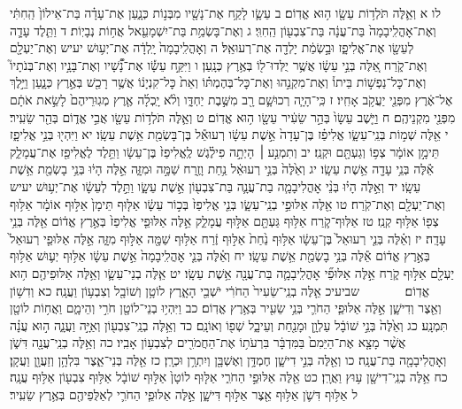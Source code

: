 \documentclass[twoside, openany, parskip=half, 11pt]{book}
\begin{document}
לו א וְאֵ֛לֶּה תֹּלְד֥וֹת עֵשָׂ֖ו ה֥וּא אֱדֽוֹם׃ ב עֵשָׂ֛ו לָקַ֥ח אֶת־נָשָׁ֖יו מִבְּנ֣וֹת כְּנָ֑עַן אֶת־עָדָ֗ה בַּת־אֵילוֹן֙ הַֽחִתִּ֔י וְאֶת־אׇהֳלִֽיבָמָה֙ בַּת־עֲנָ֔ה בַּת־צִבְע֖וֹן הַֽחִוִּֽי׃ ג וְאֶת־בָּשְׂמַ֥ת בַּת־יִשְׁמָעֵ֖אל אֲח֥וֹת נְבָיֽוֹת׃ ד וַתֵּ֧לֶד עָדָ֛ה לְעֵשָׂ֖ו אֶת־אֱלִיפָ֑ז וּבָ֣שְׂמַ֔ת יָלְדָ֖ה אֶת־רְעוּאֵֽל׃ ה וְאׇהֳלִֽיבָמָה֙ יָֽלְדָ֔ה אֶת־יְע֥וּשׁ יעיש וְאֶת־יַעְלָ֖ם וְאֶת־קֹ֑רַח אֵ֚לֶּה בְּנֵ֣י עֵשָׂ֔ו אֲשֶׁ֥ר יֻלְּדוּ־ל֖וֹ בְּאֶ֥רֶץ כְּנָֽעַן׃ ו וַיִּקַּ֣ח עֵשָׂ֡ו אֶת־נָ֠שָׁ֠יו וְאֶת־בָּנָ֣יו וְאֶת־בְּנֹתָיו֮ וְאֶת־כׇּל־נַפְשׁ֣וֹת בֵּיתוֹ֒ וְאֶת־מִקְנֵ֣הוּ וְאֶת־כׇּל־בְּהֶמְתּ֗וֹ וְאֵת֙ כׇּל־קִנְיָנ֔וֹ אֲשֶׁ֥ר רָכַ֖שׁ בְּאֶ֣רֶץ כְּנָ֑עַן וַיֵּ֣לֶךְ אֶל־אֶ֔רֶץ מִפְּנֵ֖י יַעֲקֹ֥ב אָחִֽיו׃ ז כִּֽי־הָיָ֧ה רְכוּשָׁ֛ם רָ֖ב מִשֶּׁ֣בֶת יַחְדָּ֑ו וְלֹ֨א יָֽכְלָ֜ה אֶ֤רֶץ מְגֽוּרֵיהֶם֙ לָשֵׂ֣את אֹתָ֔ם מִפְּנֵ֖י מִקְנֵיהֶֽם׃ ח וַיֵּ֤שֶׁב עֵשָׂו֙ בְּהַ֣ר שֵׂעִ֔יר עֵשָׂ֖ו ה֥וּא אֱדֽוֹם׃ ט וְאֵ֛לֶּה תֹּלְד֥וֹת עֵשָׂ֖ו אֲבִ֣י אֱד֑וֹם בְּהַ֖ר שֵׂעִֽיר׃ י אֵ֖לֶּה שְׁמ֣וֹת בְּנֵֽי־עֵשָׂ֑ו אֱלִיפַ֗ז בֶּן־עָדָה֙ אֵ֣שֶׁת עֵשָׂ֔ו רְעוּאֵ֕ל בֶּן־בָּשְׂמַ֖ת אֵ֥שֶׁת עֵשָֽׂו׃ יא וַיִּהְי֖וּ בְּנֵ֣י אֱלִיפָ֑ז תֵּימָ֣ן אוֹמָ֔ר צְפ֥וֹ וְגַעְתָּ֖ם וּקְנַֽז׃ יב וְתִמְנַ֣ע ׀ הָיְתָ֣ה פִילֶ֗גֶשׁ לֶֽאֱלִיפַז֙ בֶּן־עֵשָׂ֔ו וַתֵּ֥לֶד לֶאֱלִיפַ֖ז אֶת־עֲמָלֵ֑ק אֵ֕לֶּה בְּנֵ֥י עָדָ֖ה אֵ֥שֶׁת עֵשָֽׂו׃ יג וְאֵ֙לֶּה֙ בְּנֵ֣י רְעוּאֵ֔ל נַ֥חַת וָזֶ֖רַח שַׁמָּ֣ה וּמִזָּ֑ה אֵ֣לֶּה הָי֔וּ בְּנֵ֥י בָשְׂמַ֖ת אֵ֥שֶׁת עֵשָֽׂו׃ יד וְאֵ֣לֶּה הָי֗וּ בְּנֵ֨י אׇהֳלִיבָמָ֧ה בַת־עֲנָ֛ה בַּת־צִבְע֖וֹן אֵ֣שֶׁת עֵשָׂ֑ו וַתֵּ֣לֶד לְעֵשָׂ֔ו אֶת־יְע֥וּשׁ יעיש וְאֶת־יַעְלָ֖ם וְאֶת־קֹֽרַח׃ טו אֵ֖לֶּה אַלּוּפֵ֣י בְנֵֽי־עֵשָׂ֑ו בְּנֵ֤י אֱלִיפַז֙ בְּכ֣וֹר עֵשָׂ֔ו אַלּ֤וּף תֵּימָן֙ אַלּ֣וּף אוֹמָ֔ר אַלּ֥וּף צְפ֖וֹ אַלּ֥וּף קְנַֽז׃ טז אַלּֽוּף־קֹ֛רַח אַלּ֥וּף גַּעְתָּ֖ם אַלּ֣וּף עֲמָלֵ֑ק אֵ֣לֶּה אַלּוּפֵ֤י אֱלִיפַז֙ בְּאֶ֣רֶץ אֱד֔וֹם אֵ֖לֶּה בְּנֵ֥י עָדָֽה׃ יז וְאֵ֗לֶּה בְּנֵ֤י רְעוּאֵל֙ בֶּן־עֵשָׂ֔ו אַלּ֥וּף נַ֙חַת֙ אַלּ֣וּף זֶ֔רַח אַלּ֥וּף שַׁמָּ֖ה אַלּ֣וּף מִזָּ֑ה אֵ֣לֶּה אַלּוּפֵ֤י רְעוּאֵל֙ בְּאֶ֣רֶץ אֱד֔וֹם אֵ֕לֶּה בְּנֵ֥י בָשְׂמַ֖ת אֵ֥שֶׁת עֵשָֽׂו׃ יח וְאֵ֗לֶּה בְּנֵ֤י אׇהֳלִֽיבָמָה֙ אֵ֣שֶׁת עֵשָׂ֔ו אַלּ֥וּף יְע֛וּשׁ אַלּ֥וּף יַעְלָ֖ם אַלּ֣וּף קֹ֑רַח אֵ֣לֶּה אַלּוּפֵ֞י אׇהֳלִֽיבָמָ֛ה בַּת־עֲנָ֖ה אֵ֥שֶׁת עֵשָֽׂו׃ יט אֵ֧לֶּה בְנֵי־עֵשָׂ֛ו וְאֵ֥לֶּה אַלּוּפֵיהֶ֖ם ה֥וּא אֱדֽוֹם׃
　　　 שביעיכ אֵ֤לֶּה בְנֵֽי־שֵׂעִיר֙ הַחֹרִ֔י יֹשְׁבֵ֖י הָאָ֑רֶץ לוֹטָ֥ן וְשׁוֹבָ֖ל וְצִבְע֥וֹן וַעֲנָֽה׃ כא וְדִשׁ֥וֹן וְאֵ֖צֶר וְדִישָׁ֑ן אֵ֣לֶּה אַלּוּפֵ֧י הַחֹרִ֛י בְּנֵ֥י שֵׂעִ֖יר בְּאֶ֥רֶץ אֱדֽוֹם׃ כב וַיִּהְי֥וּ בְנֵי־לוֹטָ֖ן חֹרִ֣י וְהֵימָ֑ם וַאֲח֥וֹת לוֹטָ֖ן תִּמְנָֽע׃ כג וְאֵ֙לֶּה֙ בְּנֵ֣י שׁוֹבָ֔ל עַלְוָ֥ן וּמָנַ֖חַת וְעֵיבָ֑ל שְׁפ֖וֹ וְאוֹנָֽם׃ כד וְאֵ֥לֶּה בְנֵֽי־צִבְע֖וֹן וְאַיָּ֣ה וַעֲנָ֑ה ה֣וּא עֲנָ֗ה אֲשֶׁ֨ר מָצָ֤א אֶת־הַיֵּמִם֙ בַּמִּדְבָּ֔ר בִּרְעֹת֥וֹ אֶת־הַחֲמֹרִ֖ים לְצִבְע֥וֹן אָבִֽיו׃ כה וְאֵ֥לֶּה בְנֵֽי־עֲנָ֖ה דִּשֹׁ֑ן וְאׇהֳלִיבָמָ֖ה בַּת־עֲנָֽה׃ כו וְאֵ֖לֶּה בְּנֵ֣י דִישָׁ֑ן חֶמְדָּ֥ן וְאֶשְׁבָּ֖ן וְיִתְרָ֥ן וּכְרָֽן׃ כז אֵ֖לֶּה בְּנֵי־אֵ֑צֶר בִּלְהָ֥ן וְזַעֲוָ֖ן וַעֲקָֽן׃ כח אֵ֥לֶּה בְנֵֽי־דִישָׁ֖ן ע֥וּץ וַאֲרָֽן׃ כט אֵ֖לֶּה אַלּוּפֵ֣י הַחֹרִ֑י אַלּ֤וּף לוֹטָן֙ אַלּ֣וּף שׁוֹבָ֔ל אַלּ֥וּף צִבְע֖וֹן אַלּ֥וּף עֲנָֽה׃ ל אַלּ֥וּף דִּשֹׁ֛ן אַלּ֥וּף אֵ֖צֶר אַלּ֣וּף דִּישָׁ֑ן אֵ֣לֶּה אַלּוּפֵ֧י הַחֹרִ֛י לְאַלֻּפֵיהֶ֖ם בְּאֶ֥רֶץ שֵׂעִֽיר׃
\end{document}
